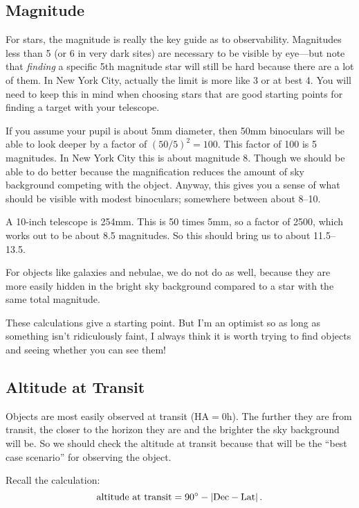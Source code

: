 \documentclass[12pt, preprint]{aastex}
\begin{document}
\subsection{Magnitude}

For stars, the magnitude is really the key guide as to
observability. Magnitudes less than 5 (or 6 in very dark sites) are
necessary to be visible by eye---but note that {\it finding} a
specific 5th magnitude star will still be hard because there are a lot
of them. In New York City, actually the limit is more like 3 or at
best 4. You will need to keep this in mind when choosing stars that
are good starting points for finding a target with your telescope.

If you assume your pupil is about 5mm diameter, then 50mm binoculars
will be able to look deeper by a factor of $(50/5)^2 = 100$. This
factor of 100 is 5 magnitudes. In New York City this is about
magnitude 8. Though we should be able to do better because the
magnification reduces the amount of sky background competing with the
object. Anyway, this gives you a sense of what should be visible with
modest binoculars; somewhere between about 8--10.

A 10-inch telescope is 254mm. This is 50 times 5mm, so a factor of
2500, which works out to be about 8.5 magnitudes. So this should bring
us to about 11.5--13.5.

For objects like galaxies and nebulae, we do not do as well, because
they are more easily hidden in the bright sky background compared to a
star with the same total magnitude.

These calculations give a starting point. But I'm an optimist so as
long as something isn't ridiculously faint, I always think it is worth
trying to find objects and seeing whether you can see them!

\subsection{Altitude at Transit}

Objects are most easily observed at transit (HA$=0$h). The further
they are from transit, the closer to the horizon they are and the
brighter the sky background will be. So we should check the altitude
at transit because that will be the ``best case scenario'' for
observing the object.

Recall the calculation:
\begin{equation}
\label{eq:maxalt2}
\mathrm{altitude~at~transit} = 90{}^\circ - \left|\mathrm{Dec} -
\mathrm{Lat}\right|.
\end{equation}
\end{document}
